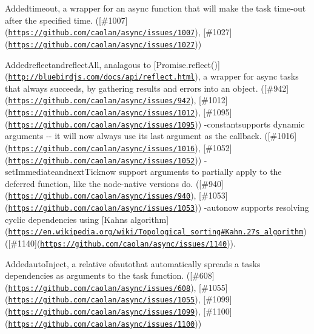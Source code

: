 \begin{DoxyItemize}
\item {\ttfamily Added}timeout{\ttfamily , a wrapper for an async function that will make the task time-\/out after the specified time. (\mbox{[}\#1007\mbox{]}(\href{https://github.com/caolan/async/issues/1007}{\tt https\+://github.\+com/caolan/async/issues/1007}), \mbox{[}\#1027\mbox{]}(\href{https://github.com/caolan/async/issues/1027}{\tt https\+://github.\+com/caolan/async/issues/1027}))}
\item {\ttfamily Added}reflect{\ttfamily and}reflect\+All{\ttfamily , analagous to \mbox{[}}Promise.\+reflect(){\ttfamily \mbox{]}(\href{http://bluebirdjs.com/docs/api/reflect.html}{\tt http\+://bluebirdjs.\+com/docs/api/reflect.\+html}), a wrapper for async tasks that always succeeds, by gathering results and errors into an object. (\mbox{[}\#942\mbox{]}(\href{https://github.com/caolan/async/issues/942}{\tt https\+://github.\+com/caolan/async/issues/942}), \mbox{[}\#1012\mbox{]}(\href{https://github.com/caolan/async/issues/1012}{\tt https\+://github.\+com/caolan/async/issues/1012}), \mbox{[}\#1095\mbox{]}(\href{https://github.com/caolan/async/issues/1095}{\tt https\+://github.\+com/caolan/async/issues/1095})) -\/}constant{\ttfamily supports dynamic arguments -\/-\/ it will now always use its last argument as the callback. (\mbox{[}\#1016\mbox{]}(\href{https://github.com/caolan/async/issues/1016}{\tt https\+://github.\+com/caolan/async/issues/1016}), \mbox{[}\#1052\mbox{]}(\href{https://github.com/caolan/async/issues/1052}{\tt https\+://github.\+com/caolan/async/issues/1052})) -\/}set\+Immediate{\ttfamily and}next\+Tick{\ttfamily now support arguments to partially apply to the deferred function, like the node-\/native versions do. (\mbox{[}\#940\mbox{]}(\href{https://github.com/caolan/async/issues/940}{\tt https\+://github.\+com/caolan/async/issues/940}), \mbox{[}\#1053\mbox{]}(\href{https://github.com/caolan/async/issues/1053}{\tt https\+://github.\+com/caolan/async/issues/1053})) -\/}auto{\ttfamily now supports resolving cyclic dependencies using \mbox{[}Kahn\textquotesingle{}s algorithm\mbox{]}(\href{https://en.wikipedia.org/wiki/Topological_sorting#Kahn.27s_algorithm}{\tt https\+://en.\+wikipedia.\+org/wiki/\+Topological\+\_\+sorting\#\+Kahn.\+27s\+\_\+algorithm}) (\mbox{[}\#1140\mbox{]}(\href{https://github.com/caolan/async/issues/1140}{\tt https\+://github.\+com/caolan/async/issues/1140})).}
\item {\ttfamily Added}auto\+Inject{\ttfamily , a relative of}auto{\ttfamily that automatically spreads a task\textquotesingle{}s dependencies as arguments to the task function. (\mbox{[}\#608\mbox{]}(\href{https://github.com/caolan/async/issues/608}{\tt https\+://github.\+com/caolan/async/issues/608}), \mbox{[}\#1055\mbox{]}(\href{https://github.com/caolan/async/issues/1055}{\tt https\+://github.\+com/caolan/async/issues/1055}), \mbox{[}\#1099\mbox{]}(\href{https://github.com/caolan/async/issues/1099}{\tt https\+://github.\+com/caolan/async/issues/1099}), \mbox{[}\#1100\mbox{]}(\href{https://github.com/caolan/async/issues/1100}{\tt https\+://github.\+com/caolan/async/issues/1100}))}

\end{DoxyItemize}
